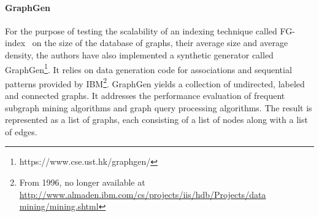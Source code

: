 \paragraph{GraphGen} For the purpose of testing the scalability of an indexing
technique called FG-index~\cite{Cheng:2007:FTV:1247480.1247574} on the size of the
database of graphs, their average size and average density, the authors have
also implemented a synthetic generator called
GraphGen\footnote{https://www.cse.ust.hk/graphgen/}. It relies on data generation code for associations and sequential
patterns provided by IBM\footnote{From 1996, no longer available at
\url{http://www.almaden.ibm.com/cs/projects/iis/hdb/Projects/data
mining/mining.shtml}}. GraphGen yields a collection of undirected, labeled and
connected graphs. It addresses the performance evaluation of frequent subgraph mining
algorithms and graph query processing algorithms. The result is represented as a
list of graphs, each consisting of a list of nodes along with a list of edges.



